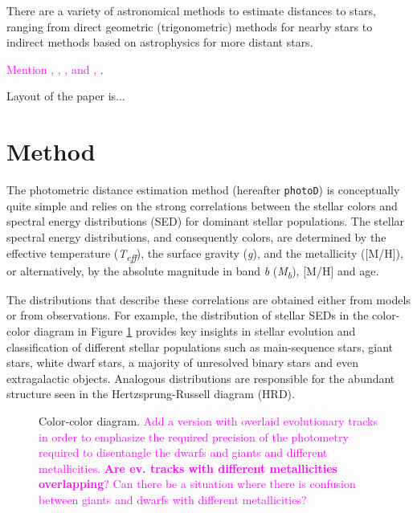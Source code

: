 \documentclass[linenumbers, twocolumn, trackchanges]{aastex631}
\newcommand{\magcom}[1]{\textcolor{magenta}{#1}} %
\newcommand{\pd}{\texttt{photoD}\xspace}
\begin{document}
There are a variety of astronomical methods to estimate distances to stars, ranging from direct geometric (trigonometric) methods for nearby stars to indirect methods based on astrophysics for more distant stars. 

\magcom{Mention \cite{bailer-jones_estimating_2021}, \cite{gordon_panchromatic_2016}, \cite{green_measuring_2014,green_three-dimensional_2015,green_3d_2019}, \cite{juric_milky_2008} and \cite{lallement_3d_2014}, \cite{queiroz_starhorse_2018}}.

Layout of the paper is...

\section{Method} \label{sec:method}

The photometric distance estimation method (hereafter \pd) is conceptually quite simple and relies on the strong correlations between the stellar colors and spectral energy distributions (SED) for dominant stellar populations. The stellar spectral energy distributions, and consequently colors, are determined by the effective temperature (\textit{T\textsubscript{eff}}), the surface gravity (\textit{g}), and the metallicity ([M/H]), or alternatively, by the absolute magnitude in band \textit{b} (\textit{M\textsubscript{b}}), [M/H] and age.

The distributions that describe these correlations are obtained either from models or from observations. For example, the distribution of stellar SEDs in the color-color diagram in Figure \ref{fig:2c_example} provides key insights in stellar evolution and classification of different stellar populations such as main-sequence stars, giant stars, white dwarf stars, a majority of unresolved binary stars and even extragalactic objects. Analogous distributions are responsible for the abundant structure seen in the Hertzsprung-Russell diagram (HRD).

\begin{figure}[ht!]
	\caption{Color-color diagram. \magcom{Add a version with overlaid evolutionary tracks in order to emphasize the required precision of the photometry required to disentangle the dwarfs and giants and different metallicities. \textbf{Are ev. tracks with different metallicities overlapping}? Can there be a situation where there is confusion between giants and dwarfs with different metallicities?} \label{fig:2c_example}}
\end{figure}
\end{document}

